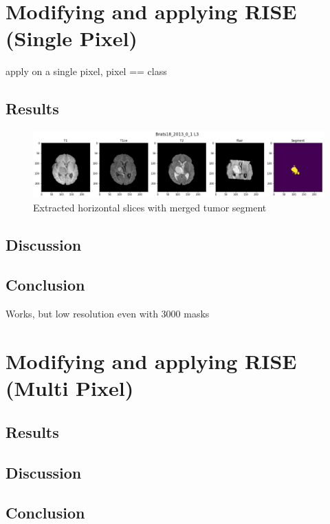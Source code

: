 \section{Modifying and applying RISE (Single Pixel)}

apply on a single pixel, pixel == class

\subsection{Results}

\begin{figure}[H]
\centering
\caption{Extracted horizontal slices with merged tumor segment}
\includegraphics[width=15cm]{chapters/04_segmentation/images/preprocessing.png}
\end{figure}



\subsection{Discussion}

\subsection{Conclusion}
Works, but low resolution even with 3000 masks

\section{Modifying and applying RISE (Multi Pixel)}


\subsection{Results}

\subsection{Discussion}

\subsection{Conclusion}
